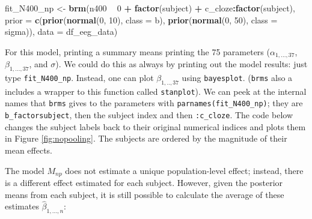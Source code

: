 \documentclass[12pt,]{krantz}
\newenvironment{Shaded}{\begin{snugshade}}{\end{snugshade}}
\newcommand{\KeywordTok}[1]{\textcolor[rgb]{0.13,0.29,0.53}{\textbf{#1}}}
\newcommand{\DataTypeTok}[1]{\textcolor[rgb]{0.13,0.29,0.53}{#1}}
\newcommand{\DecValTok}[1]{\textcolor[rgb]{0.00,0.00,0.81}{#1}}
\newcommand{\StringTok}[1]{\textcolor[rgb]{0.31,0.60,0.02}{#1}}
\newcommand{\OperatorTok}[1]{\textcolor[rgb]{0.81,0.36,0.00}{\textbf{#1}}}
\newcommand{\NormalTok}[1]{#1}
\theoremstyle{definition}
\theoremstyle{definition}
\theoremstyle{definition}
\theoremstyle{remark}
\begin{document}
\begin{Shaded}
\begin{Highlighting}[]
\NormalTok{fit_N400_np <-}\StringTok{ }\KeywordTok{brm}\NormalTok{(n400 }\OperatorTok{~}\StringTok{ }\DecValTok{0} \OperatorTok{+}\StringTok{ }\KeywordTok{factor}\NormalTok{(subject) }\OperatorTok{+}\StringTok{ }\NormalTok{c_cloze}\OperatorTok{:}\KeywordTok{factor}\NormalTok{(subject),}
                 \DataTypeTok{prior =}
                     \KeywordTok{c}\NormalTok{(}\KeywordTok{prior}\NormalTok{(}\KeywordTok{normal}\NormalTok{(}\DecValTok{0}\NormalTok{, }\DecValTok{10}\NormalTok{), }\DataTypeTok{class =}\NormalTok{ b),}
                       \KeywordTok{prior}\NormalTok{(}\KeywordTok{normal}\NormalTok{(}\DecValTok{0}\NormalTok{, }\DecValTok{50}\NormalTok{), }\DataTypeTok{class =}\NormalTok{ sigma)),}
                 \DataTypeTok{data =}\NormalTok{ df_eeg_data)}
\end{Highlighting}
\end{Shaded}

For this model, printing a summary means printing the 75 parameters
(\(\alpha_{1,...,37}\), \(\beta_{1,...,37}\), and \(\sigma\)). We could
do this as always by printing out the model results: just type
\texttt{fit\_N400\_np}. Instead, one can plot \(\beta_{1,..,37}\) using
\texttt{bayesplot}. (\texttt{brms} also a includes a wrapper to this
function called \texttt{stanplot}). We can peek at the internal names
that \texttt{brms} gives to the parameters with
\texttt{parnames(fit\_N400\_np)}; they are \texttt{b\_factorsubject},
then the subject index and then \texttt{:c\_cloze}. The code below
changes the subject labels back to their original numerical indices and
plots them in Figure \ref{fig:nopooling}. The subjects are ordered by
the magnitude of their mean effects.

The model \(M_{np}\) does not estimate a unique population-level effect;
instead, there is a different effect estimated for each subject.
However, given the posterior means from each subject, it is still
possible to calculate the average of these estimates
\(\hat\beta_{1,...,n}\):
\end{document}
